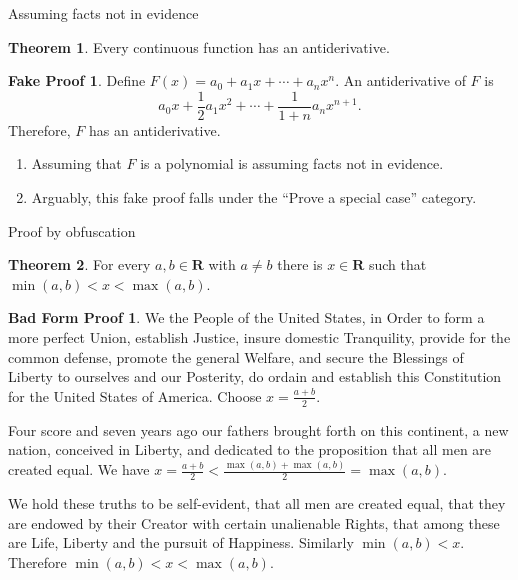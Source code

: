 \documentclass[fleqn]{beamer}
\newcommand{\reals}{\mathbf{R}}
\theoremstyle{definition}
\newtheorem{myth}{Theorem}
\newtheorem{myfakeproof}{Fake Proof}
\newtheorem{mybadformproof}{Bad Form Proof}
\begin{document}
\begin{frame}{Assuming facts not in evidence}

\begin{myth}  Every continuous function has an antiderivative.  \end{myth}


\begin{myfakeproof}      Define  \(F(x) = a_0 + a_1 x + \cdots + a_n x^n \).  An antiderivative of \(F\) is
\[
    a_0 x + \frac{1}{2} a_1 x^2 + \cdots + \frac{1}{1+n} a_n x^{n+1}.
\]
Therefore, \(F\) has an antiderivative.
\end{myfakeproof}

\begin{enumerate}

\item Assuming that \(F\) is a polynomial is assuming facts not  in evidence.

\item Arguably, this fake proof falls under the ``Prove a special case'' category.
\end{enumerate}
\end{frame}


\begin{frame}{Proof by obfuscation}



\begin{myth}  For every \(a,b \in \reals \) with \(a \neq b\) there is  \(x \in \reals\) such that \( \min(a,b) < x < \max(a,b) \).  \end{myth}

\begin{mybadformproof}
We the People of the United States, in Order to form a more perfect Union, establish Justice, insure domestic Tranquility, provide for the common defense, promote the general Welfare, and secure the
Blessings of Liberty to ourselves and our Posterity, do ordain and establish this Constitution for the United States of America.  Choose \(x = \frac{a+b}{2} \).

\quad Four score and seven years ago our fathers brought forth on this continent, a new nation, conceived in Liberty, and dedicated to the proposition that all men are created equal.  We have
\( x = \frac{a+b}{2} < \frac{ \max(a,b)  +  \max(a,b) }{2} =  \max(a,b)\).

\quad We hold these truths to be self-evident, that all men are created equal, that they are endowed by their Creator with certain unalienable Rights, that among these are Life, Liberty and the pursuit of Happiness. Similarly \(\min(a,b) < x\). Therefore  \( \min(a,b) < x < \max(a,b) \).

\end{mybadformproof}
\end{frame}
\end{document}
